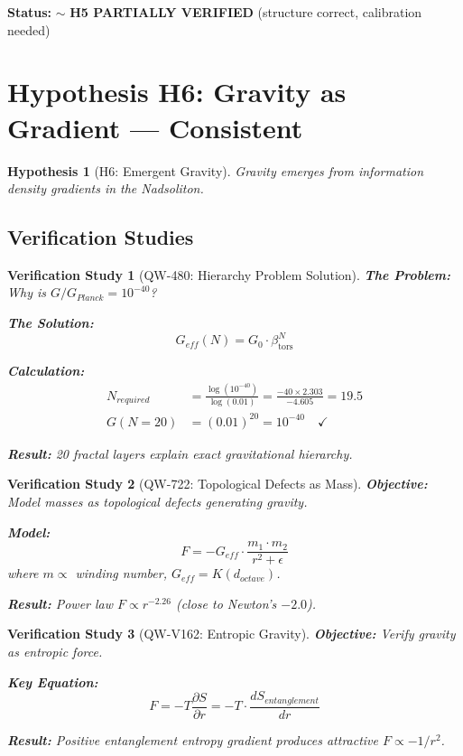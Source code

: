 \documentclass[11pt,a4paper]{book}
\newtheorem{hypothesis}{Hypothesis}[section]
\newtheorem{verification}{Verification Study}[section]
\theoremstyle{remark}
\newcommand{\betators}{\beta_{\text{tors}}}
\begin{document}
\textbf{Status:} $\sim$ \textbf{H5 PARTIALLY VERIFIED} (structure correct, calibration needed)

\section{Hypothesis H6: Gravity as Gradient --- Consistent}

\begin{hypothesis}[H6: Emergent Gravity]
Gravity emerges from information density gradients in the Nadsoliton.
\end{hypothesis}

\subsection{Verification Studies}

\begin{verification}[QW-480: Hierarchy Problem Solution]
\textbf{The Problem:} Why is $G/G_{Planck} = 10^{-40}$?

\textbf{The Solution:}
\begin{equation}
G_{eff}(N) = G_0 \cdot \betators^N
\end{equation}

\textbf{Calculation:}
\begin{align}
N_{required} &= \frac{\log(10^{-40})}{\log(0.01)} = \frac{-40 \times 2.303}{-4.605} = 19.5 \\
G(N=20) &= (0.01)^{20} = 10^{-40} \quad \checkmark
\end{align}

\textbf{Result:} 20 fractal layers explain exact gravitational hierarchy.
\end{verification}

\begin{verification}[QW-722: Topological Defects as Mass]
\textbf{Objective:} Model masses as topological defects generating gravity.

\textbf{Model:}
\begin{equation}
F = -G_{eff} \cdot \frac{m_1 \cdot m_2}{r^2 + \epsilon}
\end{equation}
where $m \propto$ winding number, $G_{eff} = K(d_{octave})$.

\textbf{Result:} Power law $F \propto r^{-2.26}$ (close to Newton's $-2.0$).
\end{verification}

\begin{verification}[QW-V162: Entropic Gravity]
\textbf{Objective:} Verify gravity as entropic force.

\textbf{Key Equation:}
\begin{equation}
F = -T \frac{\partial S}{\partial r} = -T \cdot \frac{dS_{entanglement}}{dr}
\end{equation}

\textbf{Result:} Positive entanglement entropy gradient produces attractive $F \propto -1/r^2$.
\end{verification}
\end{document}
